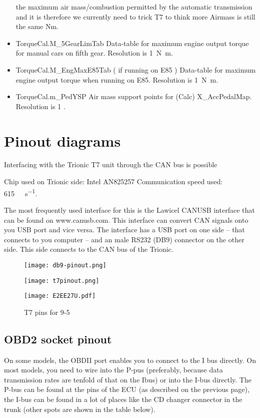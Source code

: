 \documentclass[11pt,a4paper]{book}
\begin{document}
\begin{itemize}
        the maximum air mass/combustion permitted by the automatic transmission and it is therefore we
        currently need to trick T7 to think more Airmass is still the same Nm.
    \item
        TorqueCal.M\_5GearLimTab
        Data-table for maximum engine output torque for manual cars on fifth gear.
        Resolution is \SI{1}{\newton\meter}.
    \item
        TorqueCal.M\_EngMaxE85Tab ( if running on E85 )
        Data-table for maximum engine output torque when running on E85. Resolution is
        \SI{1}{\newton\meter}.
    \item
        TorqueCal.m\_PedYSP
        Air mass support points for (Calc) X\_AccPedalMap. Resolution is 1 \si{\mgc}.
\end{itemize}

\chapter{Pinout diagrams}
Interfacing with the Trionic T7 unit through the CAN bus is possible

Chip used on Trionic side: Intel AN825257
Communication speed used: \SI{615}{\kilo\bit\per\second}.

The most frequently used interface for this is the Lawicel CANUSB interface that can be found on
www.canusb.com. This interface can convert CAN signals onto you USB port and vice versa. The
interface has a USB port on one side – that connects to you computer – and an male RS232 (DB9)
connector on the other side. This side connects to the CAN bus of the Trionic.

\begin{figure}[]
    \centering
    \texttt{[image: db9-pinout.png]}
    \caption{}
    \label{fig:}
\end{figure}
\begin{figure}[]
    \centering
    \texttt{[image: t7pinout.png]}
    \caption{}
    \label{fig:}
\end{figure}
\begin{figure}[]
    \centering
    \texttt{[image: E2EE27U.pdf]}
    \caption{T7 pins for 9-5}
    \label{fig:}
\end{figure}

\section{OBD2 socket pinout}
On some models, the
OBDII port enables you to connect to the I bus directly. On most models, you
need to wire into the P-pus (preferably, because data transmission rates are
tenfold of that on the Ibus) or into the I-bus directly. The P-bus can be found
at the pins of the ECU (as described on the previous page), the I-bus can be
found in a lot of places like the CD changer connector in the trunk (other spots
are shown in the table below).
\end{document}
